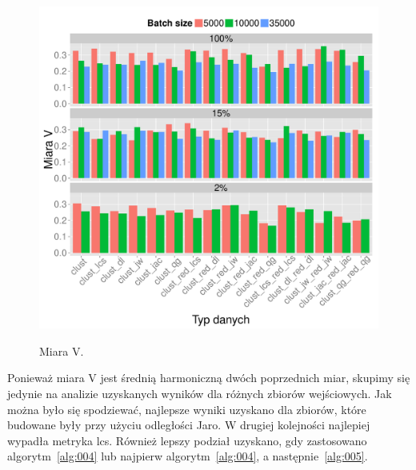 \documentclass{praca1}
\begin{document}

\begin{figure}[!h]
  \centering
  \includegraphics[width=400pt]{plot12.pdf}\\
  \caption{Miara V.}\label{plot:007}
\end{figure}

Ponieważ miara V jest średnią harmoniczną dwóch poprzednich miar, skupimy się jedynie na analizie uzyskanych wyników dla różnych zbiorów wejściowych. Jak można było się spodziewać, najlepsze wyniki uzyskano dla zbiorów, które budowane były przy użyciu odległości Jaro. W drugiej kolejności najlepiej wypadła metryka lcs. Również lepszy podział uzyskano, gdy zastosowano algorytm~\ref{alg:004} lub najpierw algorytm~\ref{alg:004}, a następnie~\ref{alg:005}. 
\end{document}
